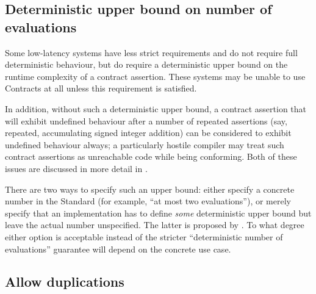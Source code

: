 \subsection{Deterministic upper bound on number of evaluations}
\label{subsec:upper}

Some low-latency systems have less strict requirements and do not require full deterministic behaviour, but do require a deterministic upper bound on the runtime complexity of a contract assertion. These systems may be unable to use Contracts at all unless this requirement is satisfied.

In addition, without such a deterministic upper bound, a contract assertion that will exhibit undefined behaviour after a number of repeated assertions (say, repeated, accumulating signed integer addition) can be considered to exhibit undefined behaviour always; a particularly hostile compiler may treat such contract assertions as unreachable code while being conforming. Both of these issues are discussed in more detail in \cite{P3119R0}.

There are two ways to specify such an upper bound: either specify a concrete number in the Standard (for example, ``at most two evaluations''), or merely specify that an implementation has to define \emph{some} deterministic upper bound but leave the actual number unspecified. The latter is proposed by \cite{P3119R0}. To what degree either option is acceptable instead of the stricter ``deterministic number of evaluations'' guarantee will depend on the concrete use case.

\subsection{Allow duplications}
\label{subsec:ville}

